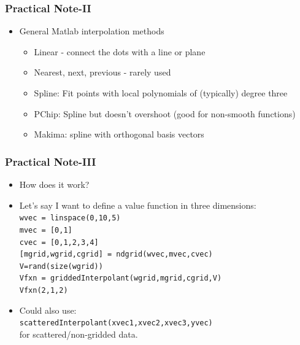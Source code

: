 \documentclass{beamer}
\begin{document}
\begin{frame}
\frametitle[alignment=center]{Practical Note-II}
\begin{itemize}
\item General Matlab interpolation methods
\begin{itemize}
\item Linear - connect the dots with a line or plane
\item Nearest, next, previous - rarely used
\item Spline:  Fit points with local  polynomials of (typically) degree three
\item PChip:  Spline but doesn't overshoot (good for non-smooth functions)
\item Makima:  spline with orthogonal basis vectors
\end{itemize}
\end{itemize}
\end{frame}

\begin{frame}
\frametitle[alignment=center]{Practical Note-III}
\begin{itemize}
\item How does it work?
\bigskip
\item Let's say I want to define a value function in three dimensions:\\
\texttt{wvec = linspace(0,10,5)}\\
\texttt{mvec = [0,1]}\\
\texttt{cvec = [0,1,2,3,4]}\\
\texttt{[mgrid,wgrid,cgrid] = ndgrid(wvec,mvec,cvec)}\\
\texttt{V=rand(size(wgrid))}\\
\texttt{Vfxn = griddedInterpolant(wgrid,mgrid,cgrid,V)}\\
\texttt{Vfxn(2,1,2)}\\
\item Could also use:\\
 \texttt{scatteredInterpolant(xvec1,xvec2,xvec3,yvec)}\\
 for scattered/non-gridded data.
\end{itemize}
\end{frame}
\end{document}
